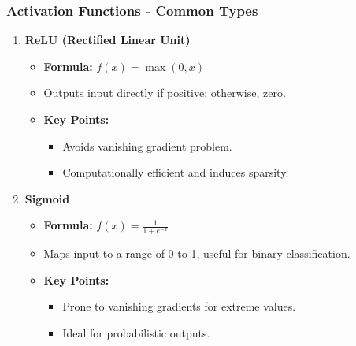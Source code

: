 \documentclass[aspectratio=169]{beamer}
\begin{document}
\begin{frame}[fragile]
    \frametitle{Activation Functions - Common Types}
    \begin{enumerate}
        \item \textbf{ReLU (Rectified Linear Unit)}
        \begin{itemize}
            \item \textbf{Formula:} \( f(x) = \max(0, x) \)
            \item Outputs input directly if positive; otherwise, zero.
            \item \textbf{Key Points:}
            \begin{itemize}
                \item Avoids vanishing gradient problem.
                \item Computationally efficient and induces sparsity.
            \end{itemize}
        \end{itemize}
        
        \item \textbf{Sigmoid}
        \begin{itemize}
            \item \textbf{Formula:} \( f(x) = \frac{1}{1 + e^{-x}} \)
            \item Maps input to a range of 0 to 1, useful for binary classification.
            \item \textbf{Key Points:}
            \begin{itemize}
                \item Prone to vanishing gradients for extreme values.
                \item Ideal for probabilistic outputs.
            \end{itemize}
        \end{itemize}
    \end{enumerate}
\end{frame}
\end{document}
